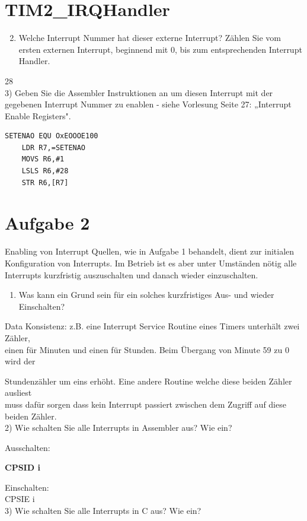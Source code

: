 \section*{TIM2\_IRQHandler}
\begin{enumerate}
  \setcounter{enumi}{1}
  \item Welche Interrupt Nummer hat dieser externe Interrupt? Zählen Sie vom ersten externen Interrupt, beginnend mit 0, bis zum entsprechenden Interrupt Handler.
\end{enumerate}

28\\
3) Geben Sie die Assembler Instruktionen an um diesen Interrupt mit der gegebenen Interrupt Nummer zu enablen - siehe Vorlesung Seite 27: „Interrupt Enable Registers".

\begin{verbatim}
SETENAO EQU OxEOOOE100
    LDR R7,=SETENAO
    MOVS R6,#1
    LSLS R6,#28
    STR R6,[R7]
\end{verbatim}

\section*{Aufgabe 2}
Enabling von Interrupt Quellen, wie in Aufgabe 1 behandelt, dient zur initialen Konfiguration von Interrupts. Im Betrieb ist es aber unter Umständen nötig alle Interrupts kurzfristig auszuschalten und danach wieder einzuschalten.

\begin{enumerate}
  \item Was kann ein Grund sein für ein solches kurzfristiges Aus- und wieder Einschalten?
\end{enumerate}

Data Konsistenz: z.B. eine Interrupt Service Routine eines Timers unterhält zwei Zähler,\\
einen für Minuten und einen für Stunden. Beim Übergang von Minute 59 zu 0 wird der

Stundenzähler um eins erhöht. Eine andere Routine welche diese beiden Zähler ausliest\\
muss dafür sorgen dass kein Interrupt passiert zwischen dem Zugriff auf diese beiden Zähler.\\
2) Wie schalten Sie alle Interrupts in Assembler aus? Wie ein?

Ausschalten:


\textbf{CPSID i}


Einschalten:\\
CPSIE i\\
3) Wie schalten Sie alle Interrupts in C aus? Wie ein?

